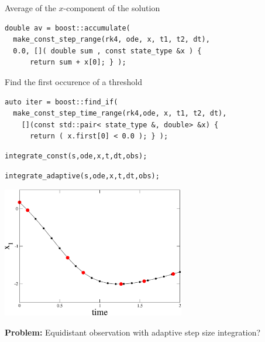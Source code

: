 \begin{frame}[fragile]


\vspace{2ex}

Average of the $x$-component of the solution
\begin{lstlisting}[basicstyle=\footnotesize\ttfamily]
double av = boost::accumulate(
  make_const_step_range(rk4, ode, x, t1, t2, dt),
  0.0, []( double sum , const state_type &x ) {
      return sum + x[0]; } );
\end{lstlisting}

\vspace{2ex}

Find the first occurence of a threshold
\begin{lstlisting}[basicstyle=\footnotesize\ttfamily]
auto iter = boost::find_if(
  make_const_step_time_range(rk4,ode, x, t1, t2, dt),
    [](const std::pair< state_type &, double> &x) {
      return ( x.first[0] < 0.0 ); } );
\end{lstlisting}


\end{frame}










\begin{frame}[fragile]


\vspace{2ex}

\begin{lstlisting}
integrate_const(s,ode,x,t,dt,obs);
\end{lstlisting}
\begin{lstlisting}
integrate_adaptive(s,ode,x,t,dt,obs);
\end{lstlisting}

\vspace{2ex}

\centerline{\includegraphics[draft=false,width=0.6\textwidth]{vdp_dense_output.pdf}}

\textbf{Problem:} Equidistant observation with adaptive step size integration?


\end{frame}



